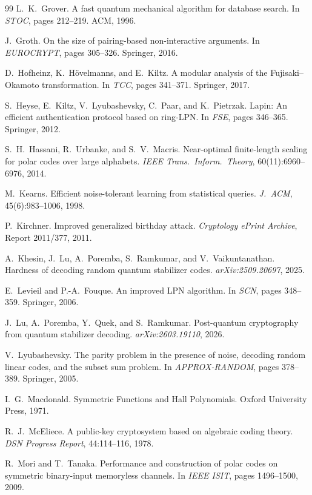 \documentclass[11pt,a4paper]{article}
\theoremstyle{plain}
\theoremstyle{definition}
\begin{document}
\begin{thebibliography}{99}
L.~K.~Grover.
A fast quantum mechanical algorithm for database search.
In \emph{STOC}, pages 212--219. ACM, 1996.

J.~Groth.
On the size of pairing-based non-interactive arguments.
In \emph{EUROCRYPT}, pages 305--326. Springer, 2016.

D.~Hofheinz, K.~H\"ovelmanns, and E.~Kiltz.
A modular analysis of the Fujisaki--Okamoto transformation.
In \emph{TCC}, pages 341--371. Springer, 2017.

S.~Heyse, E.~Kiltz, V.~Lyubashevsky, C.~Paar, and K.~Pietrzak.
Lapin: An efficient authentication protocol based on ring-LPN.
In \emph{FSE}, pages 346--365. Springer, 2012.

S.~H.~Hassani, R.~Urbanke, and S.~V.~Macris.
Near-optimal finite-length scaling for polar codes over large alphabets.
\emph{IEEE Trans.\ Inform.\ Theory}, 60(11):6960--6976, 2014.

M.~Kearns.
Efficient noise-tolerant learning from statistical queries.
\emph{J.\ ACM}, 45(6):983--1006, 1998.

P.~Kirchner.
Improved generalized birthday attack.
\emph{Cryptology ePrint Archive}, Report 2011/377, 2011.

A.~Khesin, J.~Lu, A.~Poremba, S.~Ramkumar, and V.~Vaikuntanathan.
Hardness of decoding random quantum stabilizer codes.
\emph{arXiv:2509.20697}, 2025.

E.~Levieil and P.-A.~Fouque.
An improved LPN algorithm.
In \emph{SCN}, pages 348--359. Springer, 2006.

J.~Lu, A.~Poremba, Y.~Quek, and S.~Ramkumar.
Post-quantum cryptography from quantum stabilizer decoding.
\emph{arXiv:2603.19110}, 2026.

V.~Lyubashevsky.
The parity problem in the presence of noise, decoding random linear codes, and the subset sum problem.
In \emph{APPROX-RANDOM}, pages 378--389. Springer, 2005.

I.~G.~Macdonald.
Symmetric Functions and Hall Polynomials.
Oxford University Press, 1971.

R.~J.~McEliece.
A public-key cryptosystem based on algebraic coding theory.
\emph{DSN Progress Report}, 44:114--116, 1978.

R.~Mori and T.~Tanaka.
Performance and construction of polar codes on symmetric binary-input memoryless channels.
In \emph{IEEE ISIT}, pages 1496--1500, 2009.


\end{thebibliography}
\end{document}
